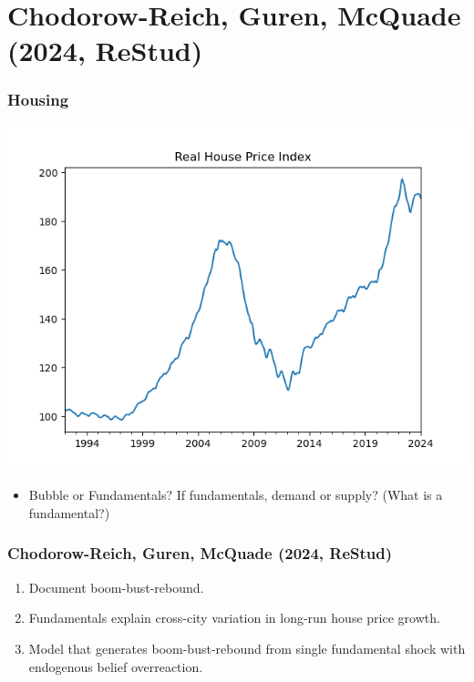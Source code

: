 \documentclass[english,xcolor=svgnames]{beamer}
\begin{document}
\section{Chodorow-Reich, Guren, McQuade (2024, ReStud)}

\begin{frame}
	\frametitle[alignment=center]{Housing}
	\begin{center}
		\includegraphics[scale=0.5]{figures/real_house_price.png}
	\end{center}
	\begin{itemize}
		\item Bubble or Fundamentals? If fundamentals, demand or supply? (What is a fundamental?)
	\end{itemize}
\end{frame}

\begin{frame}
	\frametitle[alignment=center]{Chodorow-Reich, Guren, McQuade (2024, ReStud)}
	\begin{enumerate}
		\item Document boom-bust-rebound.
		\item Fundamentals explain cross-city variation in long-run house price growth.
		\item Model that generates boom-bust-rebound from single fundamental shock with endogenous belief overreaction.
	\end{enumerate}
\end{frame}
\end{document}
